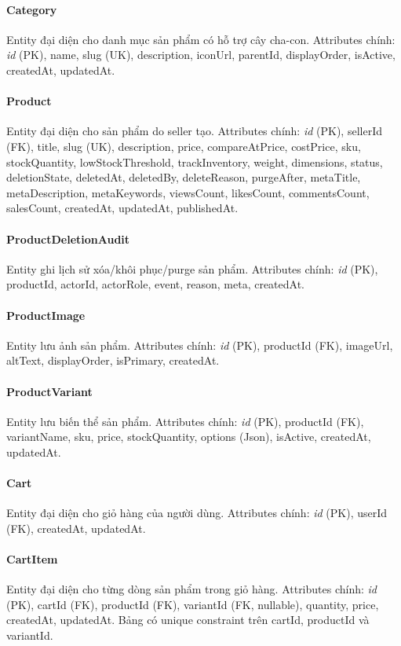 \paragraph{Category} Entity đại diện cho danh mục sản phẩm có hỗ trợ cây cha-con. Attributes chính: \textit{id} (PK), name, slug (UK), description, iconUrl, parentId, displayOrder, isActive, createdAt, updatedAt.

\paragraph{Product} Entity đại diện cho sản phẩm do seller tạo. Attributes chính: \textit{id} (PK), sellerId (FK), title, slug (UK), description, price, compareAtPrice, costPrice, sku, stockQuantity, lowStockThreshold, trackInventory, weight, dimensions, status, deletionState, deletedAt, deletedBy, deleteReason, purgeAfter, metaTitle, metaDescription, metaKeywords, viewsCount, likesCount, commentsCount, salesCount, createdAt, updatedAt, publishedAt.

\paragraph{ProductDeletionAudit} Entity ghi lịch sử xóa/khôi phục/purge sản phẩm. Attributes chính: \textit{id} (PK), productId, actorId, actorRole, event, reason, meta, createdAt.

\paragraph{ProductImage} Entity lưu ảnh sản phẩm. Attributes chính: \textit{id} (PK), productId (FK), imageUrl, altText, displayOrder, isPrimary, createdAt.

\paragraph{ProductVariant} Entity lưu biến thể sản phẩm. Attributes chính: \textit{id} (PK), productId (FK), variantName, sku, price, stockQuantity, options (Json), isActive, createdAt, updatedAt.

\paragraph{Cart} Entity đại diện cho giỏ hàng của người dùng. Attributes chính: \textit{id} (PK), userId (FK), createdAt, updatedAt.

\paragraph{CartItem} Entity đại diện cho từng dòng sản phẩm trong giỏ hàng. Attributes chính: \textit{id} (PK), cartId (FK), productId (FK), variantId (FK, nullable), quantity, price, createdAt, updatedAt. Bảng có unique constraint trên cartId, productId và variantId.

